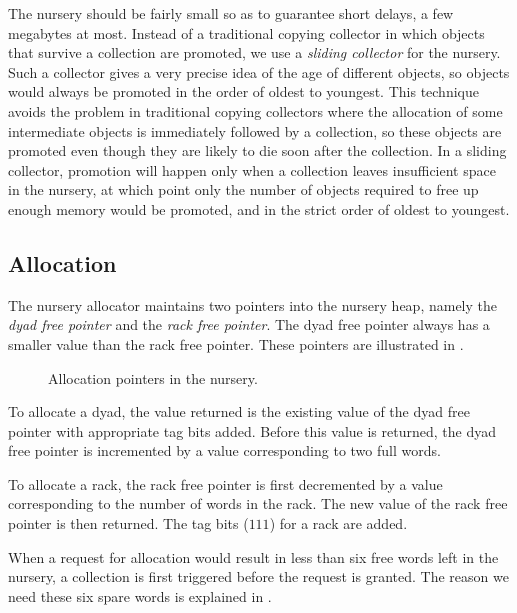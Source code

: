 The nursery should be fairly small so as to guarantee short delays, a
few megabytes at most.  Instead of a traditional copying collector in
which objects that survive a collection are promoted, we use a
\emph{sliding collector} for the nursery.  Such a collector gives a
very precise idea of the age of different objects, so objects would
always be promoted in the order of oldest to youngest.  This
technique avoids the problem in traditional copying collectors where
the allocation of some intermediate objects is immediately followed by
a collection, so these objects are promoted even though they are
likely to die soon after the collection.  In a sliding collector,
promotion will happen only when a collection leaves insufficient space
in the nursery, at which point only the number of objects required to
free up enough memory would be promoted, and in the strict order of
oldest to youngest.

\subsection{Allocation}

The nursery allocator maintains two pointers into the nursery heap,
namely the \emph{dyad free pointer} and the \emph{rack free
  pointer}.  The dyad free pointer always has a smaller value than
the rack free pointer.  These pointers are illustrated in
.

\begin{figure}
\begin{center}
\end{center}
\caption{\label{fig-nursery-pointers}
Allocation pointers in the nursery.}
\end{figure}

To allocate a dyad, the value returned is the existing value of the
dyad free pointer with appropriate tag bits added.  Before this value
is returned, the dyad free pointer is incremented by a value
corresponding to two full words.

To allocate a rack, the rack free pointer is first decremented by a
value corresponding to the number of words in the rack.  The new value
of the rack free pointer is then returned.  The tag bits ($111$) for a
rack are added.

When a request for allocation would result in less than six free words
left in the nursery, a collection is first triggered before the
request is granted.  The reason we need these six spare words is
explained in .

